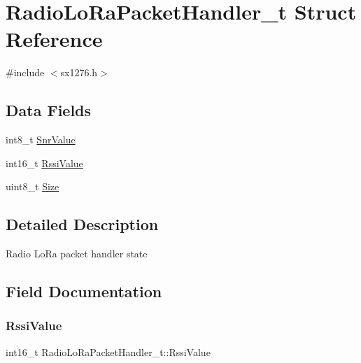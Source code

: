 \hypertarget{structRadioLoRaPacketHandler__t}{}\section{Radio\+Lo\+Ra\+Packet\+Handler\+\_\+t Struct Reference}
\label{structRadioLoRaPacketHandler__t}


{\ttfamily \#include $<$sx1276.\+h$>$}

\subsection*{Data Fields}
\begin{DoxyCompactItemize}
\item 
int8\+\_\+t \hyperlink{structRadioLoRaPacketHandler__t_a25f401925faaad4b55734743603f6c91}{Snr\+Value}
\item 
int16\+\_\+t \hyperlink{structRadioLoRaPacketHandler__t_aca9b6d06529df17be1d167d50e608a3c}{Rssi\+Value}
\item 
uint8\+\_\+t \hyperlink{structRadioLoRaPacketHandler__t_a7ff8121a147a7c190735f6a41862c155}{Size}
\end{DoxyCompactItemize}


\subsection{Detailed Description}
Radio Lo\+Ra packet handler state 

\subsection{Field Documentation}
\mbox{\label{structRadioLoRaPacketHandler__t_aca9b6d06529df17be1d167d50e608a3c}} 
\subsubsection{\texorpdfstring{Rssi\+Value}{RssiValue}}
{\footnotesize\ttfamily int16\+\_\+t Radio\+Lo\+Ra\+Packet\+Handler\+\_\+t\+::\+Rssi\+Value}

\mbox{\label{structRadioLoRaPacketHandler__t_a7ff8121a147a7c190735f6a41862c155}} 
